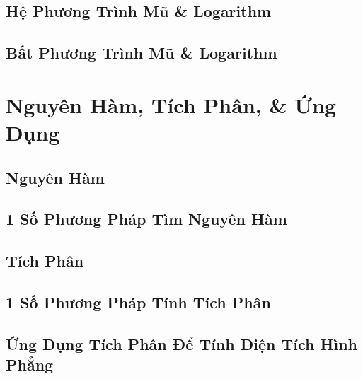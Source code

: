 \documentclass[oneside]{book}
\numberwithin{equation}{section}
\begin{document}

\section{Hệ Phương Trình Mũ \& Logarithm}


\section{Bất Phương Trình Mũ \& Logarithm}


\chapter{Nguyên Hàm, Tích Phân, \& Ứng Dụng}

\section{Nguyên Hàm}


\section{1 Số Phương Pháp Tìm Nguyên Hàm}


\section{Tích Phân}


\section{1 Số Phương Pháp Tính Tích Phân}


\section{Ứng Dụng Tích Phân Để Tính Diện Tích Hình Phẳng}
\end{document}
